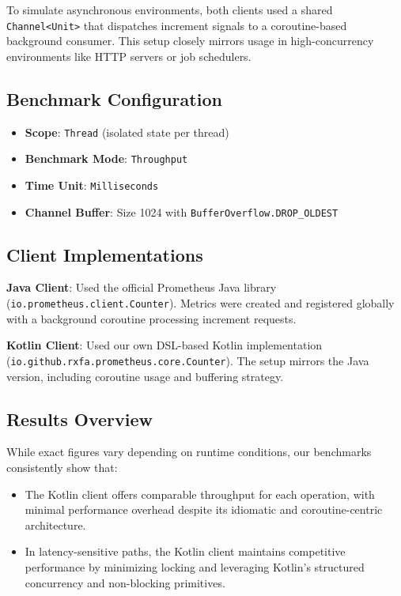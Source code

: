 To simulate asynchronous environments, both clients used a shared \texttt{Channel<Unit>} that dispatches increment signals to a coroutine-based background consumer. This setup closely mirrors usage in high-concurrency environments like HTTP servers or job schedulers.

\subsection*{Benchmark Configuration}
\begin{itemize}
    \item \textbf{Scope}: \texttt{Thread} (isolated state per thread)
    \item \textbf{Benchmark Mode}: \texttt{Throughput}
    \item \textbf{Time Unit}: \texttt{Milliseconds}
    \item \textbf{Channel Buffer}: Size 1024 with \texttt{BufferOverflow.DROP\_OLDEST}
\end{itemize}

\subsection*{Client Implementations}

\textbf{Java Client}: Used the official Prometheus Java library (\texttt{io.prometheus.client.Counter}). Metrics were created and registered globally with a background coroutine processing increment requests.

\textbf{Kotlin Client}: Used our own DSL-based Kotlin implementation (\texttt{io.github.rxfa.prometheus.core.Counter}). The setup mirrors the Java version, including coroutine usage and buffering strategy.

\subsection*{Results Overview}

While exact figures vary depending on runtime conditions, our benchmarks consistently show that:
\begin{itemize}
    \item The Kotlin client offers comparable throughput for each operation, with minimal performance overhead despite its idiomatic and coroutine-centric architecture.
    \item In latency-sensitive paths, the Kotlin client maintains competitive performance by minimizing locking and leveraging Kotlin’s structured concurrency and non-blocking primitives.
\end{itemize}

